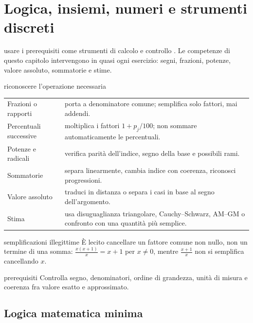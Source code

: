 \chapter{Logica, insiemi, numeri e strumenti discreti}
\label{chap:1}

\begin{obiettivocapitolo}{usare i prerequisiti come strumenti di calcolo e controllo}
\prioritaalta. Le competenze di questo capitolo intervengono in quasi ogni esercizio: segni, frazioni, potenze, valore assoluto, sommatorie e stime.
\end{obiettivocapitolo}
\begin{sceltametodo}{riconoscere l'operazione necessaria}
\begin{tabularx}{\textwidth}{@{}p{}X@{}}
Frazioni o rapporti & porta a denominatore comune; semplifica solo fattori, mai addendi.\\
Percentuali successive & moltiplica i fattori $1+p_j/100$; non sommare automaticamente le percentuali.\\
Potenze e radicali & verifica parità dell'indice, segno della base e possibili rami.\\
Sommatorie & separa linearmente, cambia indice con coerenza, riconosci progressioni.\\
Valore assoluto & traduci in distanza o separa i casi in base al segno dell'argomento.\\
Stima & usa disuguaglianza triangolare, Cauchy--Schwarz, AM--GM o confronto con una quantità più semplice.
\end{tabularx}
\end{sceltametodo}
\begin{errorefrequente}{semplificazioni illegittime}
È lecito cancellare un fattore comune non nullo, non un termine di una somma: $\frac{x(x+1)}x=x+1$ per $x\ne0$, mentre $\frac{x+1}{x}$ non si semplifica cancellando $x$.
\end{errorefrequente}
\begin{controllofinale}{prerequisiti}
Controlla segno, denominatori, ordine di grandezza, unità di misura e coerenza fra valore esatto e approssimato.
\end{controllofinale}

\section{Logica matematica minima}\label{logica-matematica-minima}

